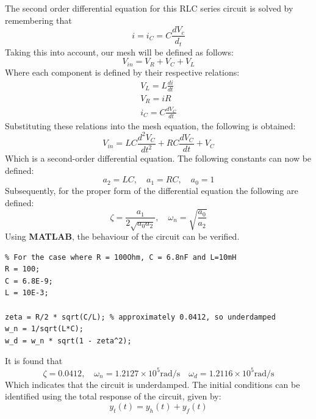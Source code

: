 The second order differential equation for this RLC series circuit is solved by remembering that
\begin{equation}
    i = i_C = C\frac{dV_c}{d_t}
\end{equation}
Taking this into account, our mesh will be defined as follows:
\begin{equation}
    V_{in} = V_R + V_C + V_L
\end{equation}
Where each component is defined by their respective relations:
\begin{equation}
    \begin{gathered}
        V_L = L\frac{di}{dt} \\
        V_R = iR \\
        i_C = C\frac{dV_C}{dt}
    \end{gathered}
\end{equation}
Substituting these relations into the mesh equation, the following is obtained:
\begin{equation}
    V_{in} = LC\frac{d^2V_C}{dt^2} + RC\frac{dV_C}{dt} + V_C
\end{equation}
Which is a second-order differential equation. The following constants can now be defined:
\begin{equation}
    a_2 = LC, \quad a_1 = RC, \quad a_0 = 1
\end{equation}
Subsequently, for the proper form of the differential equation the following are defined:
\begin{equation}
    \zeta = \frac{a_1}{2\sqrt{a_0a_2}}, \quad \omega_n = \sqrt{\frac{a_0}{a_2}}
\end{equation}
Using {\bf MATLAB}, the behaviour of the circuit can be verified.
\begin{verbatim}
% For the case where R = 100Ohm, C = 6.8nF and L=10mH
R = 100;
C = 6.8E-9;
L = 10E-3;

zeta = R/2 * sqrt(C/L); % approximately 0.0412, so underdamped
w_n = 1/sqrt(L*C);
w_d = w_n * sqrt(1 - zeta^2);

\end{verbatim}
It is found that
\begin{equation}
    \zeta = 0.0412, \quad \omega_n = 1.2127\times10^5 \text{rad/s} \quad \omega_d = 1.2116\times10^5 \text{rad/s}
\end{equation}
Which indicates that the circuit is underdamped.
The initial conditions can be identified using the total response of the circuit, given by:
\begin{equation}
    y_t(t) = y_h(t) + y_f(t)
\end{equation}

